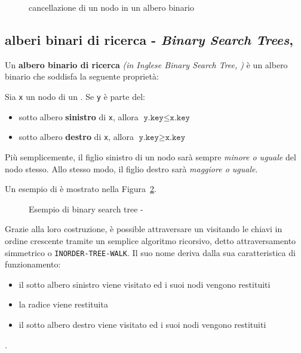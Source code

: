 \documentclass[italian, 10pt]{article}
\begin{document}
\begin{figure}[htbp]
  \bigskip
  \centering
  \caption{cancellazione di un nodo in un albero binario}
  \label{fig:cancellazione-albero-binario}
  \bigskip
\end{figure}

\subsection{alberi binari di ricerca - \textit{Binary Search Trees}, \BST}

Un \textbf{albero binario di ricerca} \textit{(in Inglese Binary Search Tree, \BST)} è un albero binario che soddisfa la seguente proprietà:

Sia \texttt{x} un nodo di un \BST.
Se \texttt{y} è parte del:

\begin{itemize}
  \item sotto albero \textbf{sinistro} di \texttt{x}, allora \(\texttt{y.key} \leq \texttt{x.key}\)
  \item sotto albero \textbf{destro} di \texttt{x}, allora \(\texttt{y.key} \geq \texttt{x.key}\)
\end{itemize}

Più semplicemente, il figlio sinistro di un nodo sarà sempre \textit{minore o uguale} del nodo stesso.
Allo stesso modo, il figlio destro sarà \textit{maggiore o uguale}.

\bigskip
Un esempio di \BST è mostrato nella Figura~\ref{fig:esempio-bst}.

\begin{figure}[htbp]
  \bigskip
  \centering
  \caption{Esempio di binary search tree - \BST}
  \label{fig:esempio-bst}
  \bigskip
\end{figure}

\bigskip
Grazie alla loro costruzione, è possible attraversare un \BST visitando le chiavi in ordine crescente tramite un semplice algoritmo ricorsivo, detto attraversamento simmetrico o \texttt{INORDER-TREE-WALK}.
Il suo nome deriva dalla sua caratteristica di funzionamento:

\begin{itemize}
  \item il sotto albero sinistro viene visitato ed i suoi nodi vengono restituiti
  \item la radice viene restituita
  \item il sotto albero destro viene visitato ed i suoi nodi vengono restituiti
\end{itemize}.
\end{document}
